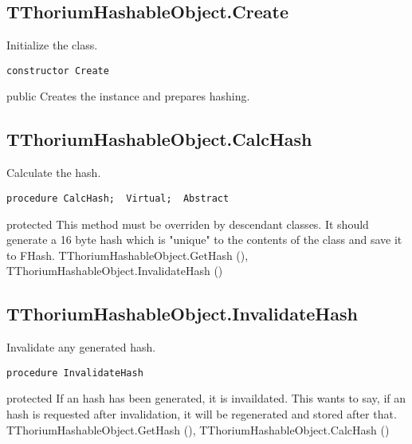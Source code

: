 \subsection{TThoriumHashableObject.Create}
\label{thoriumcorepkg:thorium:tthoriumhashableobject:create}
\begin{FPCList}
\Synopsis
Initialize the class.\Declaration 

\begin{verbatim}
constructor Create
\end{verbatim}
\Visibility
public
\Description
Creates the instance and prepares hashing.\end{FPCList}
\subsection{TThoriumHashableObject.CalcHash}
\label{thoriumcorepkg:thorium:tthoriumhashableobject:calchash}
\begin{FPCList}
\Synopsis
Calculate the hash.\Declaration 

\begin{verbatim}
procedure CalcHash;  Virtual;  Abstract
\end{verbatim}
\Visibility
protected
\Description
This method must be overriden by descendant classes. It should generate a 16 byte hash which is "unique" to the contents of the class and save it to FHash.\SeeAlso
TThoriumHashableObject.GetHash (\pageref{thoriumcorepkg:thorium:tthoriumhashableobject:gethash}),
TThoriumHashableObject.InvalidateHash (\pageref{thoriumcorepkg:thorium:tthoriumhashableobject:invalidatehash})\end{FPCList}
\subsection{TThoriumHashableObject.InvalidateHash}
\label{thoriumcorepkg:thorium:tthoriumhashableobject:invalidatehash}
\begin{FPCList}
\Synopsis
Invalidate any generated hash.\Declaration 

\begin{verbatim}
procedure InvalidateHash
\end{verbatim}
\Visibility
protected
\Description
If an hash has been generated, it is invaildated. This wants to say, if an hash is requested after invalidation, it will be regenerated and stored after that.\SeeAlso
TThoriumHashableObject.GetHash (\pageref{thoriumcorepkg:thorium:tthoriumhashableobject:gethash}),
TThoriumHashableObject.CalcHash (\pageref{thoriumcorepkg:thorium:tthoriumhashableobject:calchash})\end{FPCList}
